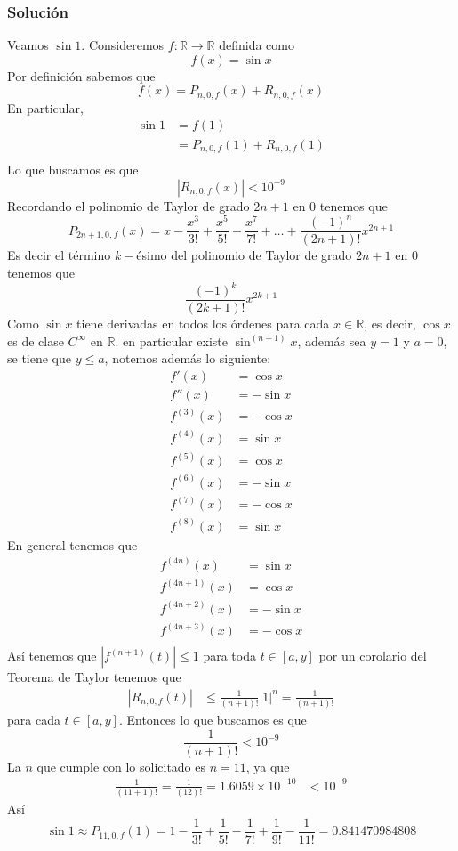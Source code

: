 \documentclass[a4paper]{article}
\begin{document}
\subsubsection*{Solución}
Veamos \(\sin{1}\).
\newline 
Consideremos \(f : \mathbb{R} \to \mathbb{R}\) definida como
\[
    f(x) = \sin{x}
\]
Por definición sabemos que 
\[
    f(x) = P_{n, 0, f}(x) + R_{n, 0, f}(x)
\]
En particular, 
\begin{align*}
    \sin{1} &= f(1) \\
    &= P_{n, 0, f}(1) + R_{n, 0, f}(1) \\
\end{align*}
Lo que buscamos es que 
\[
    | R_{n, 0, f}(x) | < 10^{-9}
\]
Recordando el polinomio de Taylor de grado \(2n + 1\) en \(0\) tenemos que
\[
    P_{2n + 1, 0, f}(x) = x - \frac{x^3}{3!} + \frac{x^5}{5!} - \frac{x^7}{7!} + \dotsc + \frac{(-1)^{n}}{(2n + 1)!}x^{2n + 1}
\]
Es decir el término \(k-\)ésimo del polinomio de Taylor de grado \(2n + 1\) en \(0\) tenemos que
\[
    \frac{(-1)^{k}}{(2k + 1)!}x^{2k + 1}
\]
Como \(\sin{x}\) tiene derivadas en todos los órdenes para cada 
\(x \in \mathbb{R}\), es decir, \(\cos{x}\) es de clase \(C^{\infty}\) en \(\mathbb{R}\).
en particular existe \(\sin^{(n+1)}{x}\), además sea \(y = 1\) y \(a = 0\), se tiene que 
\(y \leq a\), notemos además lo siguiente:
\begin{align*}
    f'(x) &= \cos{x} \\
    f''(x) &= -\sin{x} \\
    f^{(3)}(x) &= -\cos{x} \\
    f^{(4)}(x) &= \sin{x} \\
    f^{(5)}(x) &=  \cos{x}  \\
    f^{(6)}(x) &= -\sin{x}  \\
    f^{(7)}(x) &= -\cos{x} \\
    f^{(8)}(x) &=  \sin{x} 
\end{align*}
En general tenemos que
\begin{align*}
    f^{(4n)}(x) &= \sin{x} \\
    f^{(4n + 1)}(x) &= \cos{x} \\
    f^{(4n + 2)}(x) &= -\sin{x} \\
    f^{(4n + 3)}(x) &= -\cos{x} \\
\end{align*}
Así tenemos que \(| f^{(n+1)}(t) | \leq 1\) para toda \(t \in [a, y]\) por un corolario del 
Teorema de Taylor tenemos que 
\begin{align*}
    | R_{n, 0, f}(t) | &\leq \frac{1}{(n + 1)!}|1|^{n} = \frac{1}{(n + 1)!}
\end{align*}
para cada \(t \in [a, y]\).
\newline 
Entonces lo que buscamos es que 
\[
    \frac{1}{(n + 1)!} < 10^{-9}
\]
La \(n\) que cumple con lo solicitado es \(n = 11\), ya que 
\begin{align*}
    \frac{1}{(11 + 1)!} = \frac{1}{(12)!} = 1{.}6059 \times 10^{-10} & < 10^{-9}
\end{align*}
Así 
\[
    \sin{1} \approx P_{11, 0, f}(1) = 1 - \frac{1}{3!} + \frac{1}{5!} - \frac{1}{7!} + \frac{1}{9!} - \frac{1}{11!}
    = 0{.}841470984808
\]
\end{document}
